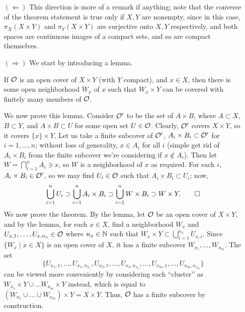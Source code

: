 \begin{itemize}
    \item[$(\Leftarrow)$] This direction is more of a remark if anything; note that the converse of the theorem statement is true only if $X, Y$ are nonempty, since in this case, $\pi_X (X \times Y)$ and $\pi_Y (X \times Y)$ are surjective onto $X, Y$ respectively, and both spaces are continuous images of a compact sets, and so are compact themselves.
    \item[$(\Rightarrow)$] We start by introducing a lemma.
    \begin{simplelemma}
        If $\mathcal O$ is an open cover of $X \times Y$ (with $Y$ compact), and $x \in X$, then there is some open neighborhood $W_x$ of $x$ such that $W_x \times Y$ can be covered with finitely many members of $\mathcal O$.
    \end{simplelemma}
    \noindent We now prove this lemma. Consider $\mathcal O'$ to be the set of $A \times B$, where $A \subset X$, $B \subset Y$, and $A \times B \subset U$ for some open set $U \in \mathcal O$. Clearly, $\mathcal O'$ covers $X \times Y$, so it covers $\{x\} \times Y$. Let us take a finite subcover of $\mathcal O'$, $A_i \times B_i \subset \mathcal O'$ for $i = 1, \dots, n$; without loss of generality, $x \in A_i$ for all $i$ (simple get rid of $A_i \times B_i$ from the finite subcover we're considering if $x \not\in A_i$). Then let $W = \bigcap_{i=1}^n A_i \ni x$, so $W$ is a neighborhood of $x$ as required.
    \medskip\newline
    For each $i$, $A_i \times B_i \in \mathcal O'$, so we may find $U_i \in \mathcal O$ such that $A_i \times B_i \subset U_i$; now,
    \[ \bigcup_{i=1}^n U_i \supset \bigcup_{i=1}^n A_i \times B_i \supset \bigcup_{i=1}^n W \times B_i \supset W \times Y. \qed \]
    We now prove the theorem. By the lemma, let $\mathcal O$ be an open cover of $X \times Y$, and by the lemma, for each $x \in X$, find a neighborhood $W_x$ and $U_{x, 1}, \dots, U_{x, n_x} \in \mathcal O$ where $n_x \in \mathbb N$ such that $W_x \times Y \subset \bigcup_{i=1}^{n_x} U_{x,i}$. Since $\{W_x \mid x \in X\}$ is an open cover of $X$, it has a finite subcover $W_{x_1}, \dots, W_{x_m}$. The set
    \[ \{U_{x_1, 1}, \dots, U_{x_1, n_{x_1}}, U_{x_2, 1}, \dots, U_{x_2, n_{x_2}}, \dots, U_{x_m, 1}, \dots, U_{x_m, n_{x_m}}\} \]
    can be viewed more conveniently by considering each ``cluster'' as $W_{x_1} \times Y \cup \dots W_{x_m} \times Y$ instead, which is equal to $(W_{x_1} \cup \dots \cup W_{x_m}) \times Y = X \times Y$. Thus, $\mathcal O$ has a finite subcover by construction.
\end{itemize}

